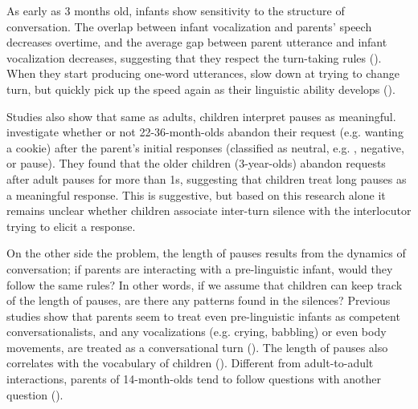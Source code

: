 As early as 3 months old, infants show sensitivity to the structure of conversation. The overlap between infant vocalization and parents' speech decreases overtime, and the average gap between parent utterance and infant vocalization decreases, suggesting that they respect the turn-taking rules (\cite{hilbrink2013turn3mo}). When they start producing one-word utterances, slow down at trying to change turn, but quickly pick up the speed again as their linguistic ability develops (\cite{hilbrink2013turn}).

Studies also show that same as adults, children interpret pauses as meaningful. \textcite{craiggallagher1983pause} 
investigate whether or not 22-36-month-olds abandon their request (e.g. wanting a cookie) after the parent's initial responses (classified as neutral, e.g. ,  negative,  or pause). They found that the older children (3-year-olds) abandon requests after adult pauses for more than 1s, suggesting that children treat long pauses as a meaningful response. This is suggestive, but based on this research alone it remains unclear whether children associate inter-turn silence with the interlocutor trying to elicit a response. 


On the other side the problem, the length of pauses results from the dynamics of conversation; if parents are interacting with a pre-linguistic infant, would they follow the same rules? In other words, if we assume that children can keep track of the length of pauses, are there any patterns found in the silences? Previous studies show that parents seem to treat even pre-linguistic infants as competent conversationalists, and any vocalizations (e.g. crying, babbling) or even body movements, are treated as a conversational turn (\cite{beebe1988,jaffe2001turn}). The length of pauses also correlates with the vocabulary of children (\cite{marklund2015pause}). Different from adult-to-adult interactions, parents of 14-month-olds tend to follow questions with another question (\cite{reimchen2017}).  

